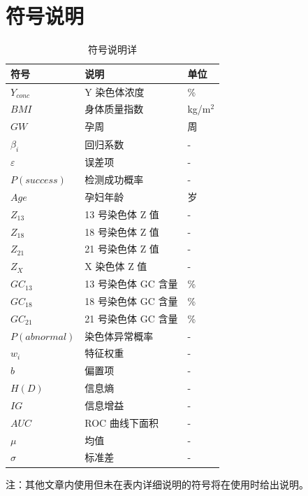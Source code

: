\documentclass[withoutpreface,bwprint]{cumcmthesis} %
\begin{document}
\section{符号说明}
\begin{table}[H]
    \centering  %
    \caption{符号说明详}  %
    \label{tab:符号说明}  %
    \begin{threeparttable}
        \begin{tabularx}{\textwidth}{p{} p{} l}
            \toprule[1.5pt]
            \textbf{符号} & \textbf{说明} & \textbf{单位} \\ 
            \midrule[1pt]
            $Y_{conc}$ & Y 染色体浓度 & \%  \\
            $BMI$ & 身体质量指数 & kg/m$^2$\\
            $GW$ & 孕周 & 周  \\
            $\beta_i$ & 回归系数 & -  \\
            $\varepsilon$ & 误差项 & -  \\
            $P(success)$ & 检测成功概率 & -  \\
            $Age$ & 孕妇年龄 & 岁  \\
            $Z_{13}$ & 13 号染色体 Z 值 & -  \\
            $Z_{18}$ & 18 号染色体 Z 值 & -  \\
            $Z_{21}$ & 21 号染色体 Z 值 & -  \\
            $Z_X$ & X 染色体 Z 值 & -  \\
            $GC_{13}$ & 13 号染色体 GC 含量 & \%  \\
            $GC_{18}$ & 18 号染色体 GC 含量 & \%  \\
            $GC_{21}$ & 21 号染色体 GC 含量 & \%  \\
            $P(abnormal)$ & 染色体异常概率 & -  \\
            $w_i$ & 特征权重 & -  \\
            $b$ & 偏置项 & -  \\
            $H(D)$ & 信息熵 & -  \\
            $IG$ & 信息增益 & -  \\
            $AUC$ & ROC 曲线下面积 & -  \\
            $\mu$ & 均值 & -  \\
            $\sigma$ & 标准差 & -\\
            \bottomrule[1.5pt]
        
        \end{tabularx}
        \begin{tablenotes}
            \footnotesize
            \item 注：其他文章内使用但未在表内详细说明的符号将在使用时给出说明。
        \end{tablenotes}
    \end{threeparttable}
\end{table}
\end{document}
